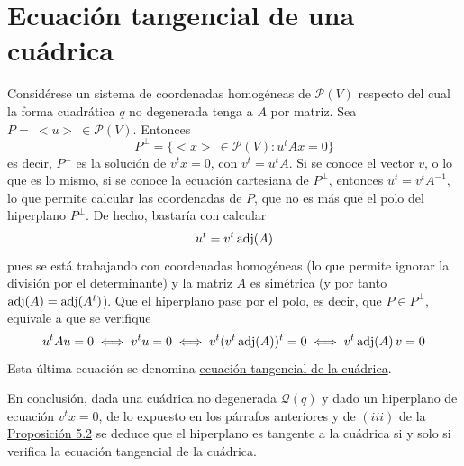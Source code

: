 \documentclass[12pt]{report}
\theoremstyle{definition}
\theoremstyle{definition}
\theoremstyle{remark}
\begin{document}
\section{Ecuación tangencial de una cuádrica}

Considérese un sistema de coordenadas homogéneas de $\mathcal{P}(V)$ respecto del cual la forma cuadrática $q$ no degenerada tenga a $A$ por matriz. Sea $P = \ <u> \ \in \mathcal{P}(V)$. Entonces
\[P^\perp = \{<x> \ \in \mathcal{P}(V) \colon u^tAx = 0\}\]
es decir, $P^\perp$ es la solución de $v^tx = 0$, con $v^t = u^tA$. Si se conoce el vector $v$, o lo que es lo mismo, si se conoce la ecuación cartesiana de $P^\perp$, entonces $u^t = v^tA^{-1}$, lo que permite calcular las coordenadas de $P$, que no es más que el polo del hiperplano $P^\perp$. De hecho, bastaría con calcular
\[u^t = v^t \, \textup{adj}(A)\]
pues se está trabajando con coordenadas homogéneas (lo que permite ignorar la división por el determinante) y la matriz $A$ es simétrica (y por tanto $\textup{adj}(A) = \textup{adj}(A^t)$). Que el hiperplano pase por el polo, es decir, que $P \in P^\perp$, equivale a que se verifique
\[u^t A u = 0 \iff v^tu = 0 \iff v^t (v^t \, \textup{adj}(A))^t = 0 \iff v^t \, \textup{adj}(A) \, v = 0\]
Esta última ecuación se denomina \ul{ecuación tangencial de la cuádrica}. 

\vspace{2mm}
En conclusión, dada una cuádrica no degenerada $\mathcal{Q}(q)$ y dado un hiperplano de ecuación $v^tx = 0$, de lo expuesto en los párrafos anteriores y de $(iii)$ de la \hyperref[prop5.2.]{\color{blue}Proposición 5.2} se deduce que el hiperplano es tangente a la cuádrica si y solo si verifica la ecuación tangencial de la cuádrica. 
\end{document}
